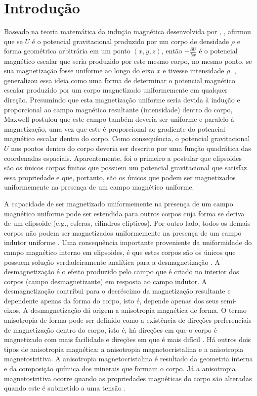 \chapter{Introdução}


Baseado na teoria matemática da indução magnética desenvolvida por
\citet{poisson1824}, \citet{maxwell1873}, afirmou que se $U$ 
é o potencial gravitacional produzido por um corpo de 
densidade $\rho$ e forma geométrica arbitrária em um ponto $(x, y, z)$,
então $-\frac{\partial U}{\partial x}$ é o potencial magnético escalar que seria
produzido por este mesmo corpo, no mesmo ponto, se sua magnetização fosse 
uniforme ao longo do eixo $x$ e tivesse intensidade $\rho$.
\citet{maxwell1873}, generalizou essa ideia como uma forma de
determinar o potencial magnético escalar produzido por um corpo 
magnetizado uniformemente em qualquer direção. Presumindo que 
esta magnetização uniforme seria devida à indução e proporcional ao campo magnético resultante (intensidade) dentro do corpo, Maxwell postulou que este campo também deveria ser uniforme e paralelo à magnetização, uma vez que este é proporcional ao gradiente do potencial magnético escalar dentro do corpo.
Como consequência, o potencial gravitacional $U$ nos pontos dentro do
corpo deveria ser descrito por uma função quadrática das coordenadas espaciais.
Aparentemente, \citet{maxwell1873} foi o primeiro a postular que elipsoides
são os únicos corpos finitos que possuem um potencial gravitacional que
satisfaz essa propriedade e que, portanto, são os únicos que podem ser
magnetizados uniformemente na presença de um campo magnético uniforme.

A capacidade de ser magnetizado uniformemente na presença de um campo magnético uniforme 
pode ser estendida para outros corpos cuja forma se
deriva de um elipsoide (e.g., esferas, cilindros elípticos). Por outro lado, todos
os demais corpos não podem ser magnetizados uniformemente na presença de um
campo indutor uniforme \citep{jahren1963, schlomann1965, clark1999}.
Uma consequência importante proveniente da uniformidade do campo magnético interno em elipsoides, 
é que estes corpos são os únicos que possuem solução 
verdadeiramente analítica para a desmagnetização \citep{clark1986}.
A desmagnetização é o efeito produzido pelo campo que é criado no interior dos corpos (campo desmagnetizante) em resposta ao campo indutor. A desmagnetização contribui para o decréscimo da magnetização resultante e dependente apenas da forma do corpo, isto é, depende apenas dos seus semi-eixos. A desmagnetização dá origem a anisotropia magnética de forma. O termo anisotropia de forma pode ser definido como a existência de direções preferenciais de magnetização dentro do corpo, isto é, há direções em que o corpo é magnetizado com mais facilidade e direções em que é mais difícil \citep{thompson1986, dunlop1997, clark1999}.
Há outros dois tipos de anisotropia magnética: a anisotropia magnetocristalina e a anisotropia magnetostritiva. A anisotropia magnetocristalina é resultado da geometria interna e da composição química dos minerais que formam o corpo. Já a anisotropia magnetostritiva ocorre quando as propriedades magnéticas do corpo são alteradas quando este é submetido a uma tensão \citep{tauxe2003rudiments, thompson1986}.

